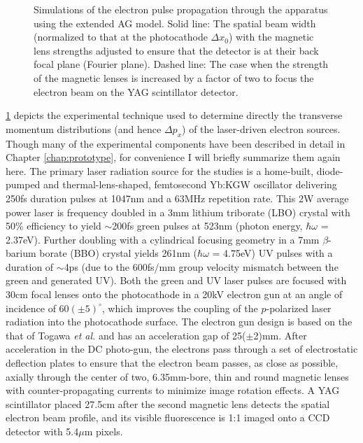 \begin{figure}
  \centering
  
  \caption[Beam profile simulation of experimental setup]{
    Simulations of the electron pulse propagation through the apparatus using the extended AG model.  
    Solid line: The spatial beam width (normalized to that at the photocathode $\Delta x_0$) with the magnetic lens strengths adjusted to ensure that the detector is at their back focal plane (Fourier plane).
    Dashed line: The case when the strength of the magnetic lenses is increased by a factor of two to focus the electron beam on the YAG scintillator detector.
  }
  \label{fig:transverse-measurement}
\end{figure}

\ref{fig:transverse-measurement} depicts the experimental technique used to determine directly the transverse momentum distributions (and hence $\Delta p_x$) of the laser-driven electron sources.
Though many of the experimental components have been described in detail in Chapter \ref{chap:prototype}, for convenience I will briefly summarize them again here.
The primary laser radiation source for the studies is a home-built, diode-pumped and thermal-lens-shaped, femtosecond Yb:KGW oscillator\cite{berger_high-power_2008} delivering 250fs duration pulses at 1047nm and a 63MHz repetition rate.
This 2W average power laser is frequency doubled in a 3mm lithium triborate (LBO) crystal with 50\% efficiency to yield $\sim$200fs green pulses at 523nm (photon energy, $\hbar \omega$ = 2.37eV).
Further doubling with a cylindrical focusing geometry in a 7mm $\beta$-barium borate (BBO) crystal yields 261nm ($\hbar \omega$ = 4.75eV) UV pulses with a duration of $\sim$4ps (due to the 600fs/mm group velocity mismatch between the green and generated UV).
Both the green and UV laser pulses are focused with 30cm focal lenses onto the photocathode in a 20kV electron gun at an angle of incidence of $60(\pm5)^{\circ}$, which improves the coupling of the $p$-polarized laser radiation into the photocathode surface\cite{berger_dc_2009}.
The electron gun design is based on the that of Togawa \textit{et al.} \cite{berger_dc_2009,togawa_ceb6_2007} and has an acceleration gap of 25($\pm$2)mm.
After acceleration in the DC photo-gun, the electrons pass through a set of electrostatic deflection plates to ensure that the electron beam passes, as close as possible, axially through the center of two, 6.35mm-bore, thin and round magnetic lenses with counter-propagating currents to minimize image rotation effects.
A YAG scintillator placed 27.5cm after the second magnetic lens detects the spatial electron beam profile, and its visible fluorescence is 1:1 imaged onto a CCD detector with 5.4$\mu$m pixels. 

